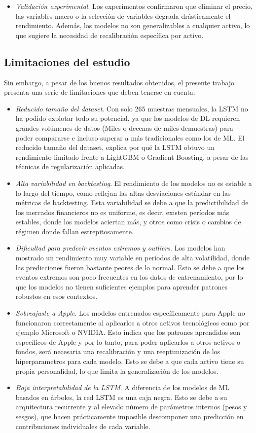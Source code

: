 \begin{itemize}
    \item \emph{Validación experimental}. Los experimentos confirmaron que eliminar el precio, las variables macro o la selección de variables degrada drásticamente el rendimiento. Además, los modelos no son generalizables a cualquier activo, lo que sugiere la necesidad de recalibración específica por activo.
\end{itemize}

\subsection{Limitaciones del estudio}
Sin embargo, a pesar de los buenos resultados obtenidos, el presente trabajo presenta una serie de limitaciones que deben tenerse en cuenta:

\begin{itemize}
    \item \emph{Reducido tamaño del dataset}. Con solo 265 muestras mensuales, la LSTM no ha podido explotar todo su potencial, ya que los modelos de DL requieren grandes volúmenes de datos (Miles o decenas de miles demuestras) para poder compararse e incluso superar a más tradicionales como los de ML. El reducido tamaño del dataset, explica por qué la LSTM obtuvo un rendimiento limitado frente a LightGBM o Gradient Boosting, a pesar de las técnicas de regularización aplicadas.
    \item \emph{Alta variabilidad en backtesting}. El rendimiento de los modelos no es estable a lo largo del tiempo, como reflejan las altas desviaciones estándar en las métricas de backtesting. Esta variabilidad se debe a que la predictibilidad de los mercados financieros no es uniforme, es decir, existen períodos más estables, donde los modelos aciertan más, y otros como crisis o cambios de régimen donde fallan estrepitosamente.
    \item \emph{Dificultad para predecir eventos extremos y outliers}. Los modelos han mostrado un rendimiento muy variable en períodos de alta volatilidad, donde las predicciones fueron bastante peores de lo normal. Esto se debe a que los eventos extremos son poco frecuentes en los datos de entrenamiento, por lo que los modelos no tienen suficientes ejemplos para aprender patrones robustos en esos contextos.
    \item \emph{Sobreajuste a Apple}. Los modelos entrenados específicamente para Apple no funcionaron correctamente al aplicarlos a otros activos tecnológicos como por ejemplo Microsoft o NVIDIA. Esto indica que los patrones aprendidos son específicos de Apple y por lo tanto, para poder aplicarlos a otros activos o fondos, será necesaria una recalibración y una reeptimización de los hiperparametros para cada modelo. Esto se debe a que cada activo tiene su propia personalidad, lo que limita la generalización de los modelos.
    \item \emph{Baja interpretabilidad de la LSTM}. A diferencia de los modelos de ML basados en árboles, la red LSTM es una caja negra. Esto se debe a su arquitectura recurrente y al elevado número de parámetros internos (pesos y sesgos), que hacen prácticamente imposible descomponer una predicción en contribuciones individuales de cada variable. 
\end{itemize}